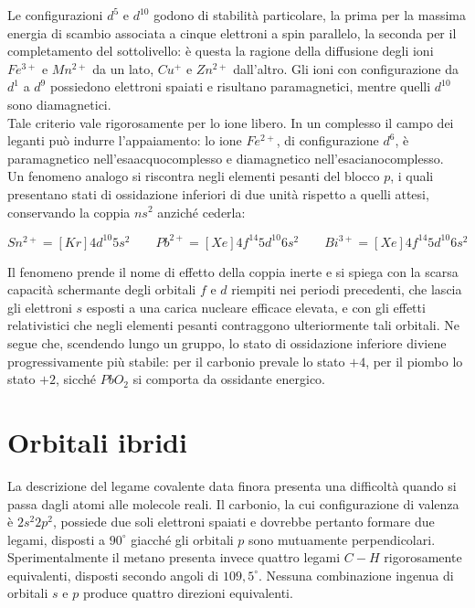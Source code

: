 Le configurazioni $d^5$ e $d^{10}$ godono di stabilità particolare, la prima per la massima energia di scambio associata a cinque elettroni a spin parallelo, la seconda per il completamento del sottolivello: è questa la ragione della diffusione degli ioni $Fe^{3+}$ e $Mn^{2+}$ da un lato, $Cu^+$ e $Zn^{2+}$ dall'altro. Gli ioni con configurazione da $d^1$ a $d^9$ possiedono elettroni spaiati e risultano paramagnetici, mentre quelli $d^{10}$ sono diamagnetici.\\

Tale criterio vale rigorosamente per lo ione libero. In un complesso il campo dei leganti può indurre l'appaiamento: lo ione $Fe^{2+}$, di configurazione $d^6$, è paramagnetico nell'esaacquocomplesso e diamagnetico nell'esacianocomplesso.\\

Un fenomeno analogo si riscontra negli elementi pesanti del blocco $p$, i quali presentano stati di ossidazione inferiori di due unità rispetto a quelli attesi, conservando la coppia $ns^2$ anziché cederla:

\begin{equation*}
    Sn^{2+} = [Kr]4d^{10}5s^2 \qquad
    Pb^{2+} = [Xe]4f^{14}5d^{10}6s^2 \qquad
    Bi^{3+} = [Xe]4f^{14}5d^{10}6s^2
\end{equation*}

Il fenomeno prende il nome di effetto della coppia inerte e si spiega con la scarsa capacità schermante degli orbitali $f$ e $d$ riempiti nei periodi precedenti, che lascia gli elettroni $s$ esposti a una carica nucleare efficace elevata, e con gli effetti relativistici che negli elementi pesanti contraggono ulteriormente tali orbitali. Ne segue che, scendendo lungo un gruppo, lo stato di ossidazione inferiore diviene progressivamente più stabile: per il carbonio prevale lo stato $+4$, per il piombo lo stato $+2$, sicché $PbO_2$ si comporta da ossidante energico.

\newpage

\section{Orbitali ibridi}

La descrizione del legame covalente data finora presenta una difficoltà quando si passa dagli atomi alle molecole reali. Il carbonio, la cui configurazione di valenza è $2s^2 2p^2$, possiede due soli elettroni spaiati e dovrebbe pertanto formare due legami, disposti a $90^\circ$ giacché gli orbitali $p$ sono mutuamente perpendicolari. 
Sperimentalmente il metano presenta invece quattro legami $C-H$ rigorosamente equivalenti, disposti secondo angoli di $109,5^\circ$. Nessuna combinazione ingenua di orbitali $s$ e $p$ produce quattro direzioni equivalenti.

